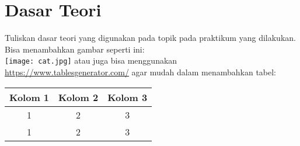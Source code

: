 \chapter{Dasar Teori}

Tuliskan dasar teori yang digunakan pada topik pada praktikum yang dilakukan. Bisa 
menambahkan gambar seperti ini:\\
\texttt{[image: cat.jpg]}
atau juga bisa menggunakan \url{https://www.tablesgenerator.com/} agar mudah dalam 
menambahkan tabel:
\begin{table}[h!]
\begin{tabular}{|c|c|c|}
\hline
\textbf{Kolom 1} & \textbf{Kolom 2} & \textbf{Kolom 3} \\ \hline
1                & 2                & 3                \\ \hline
1                & 2                & 3                \\ \hline
\end{tabular}
\end{table}